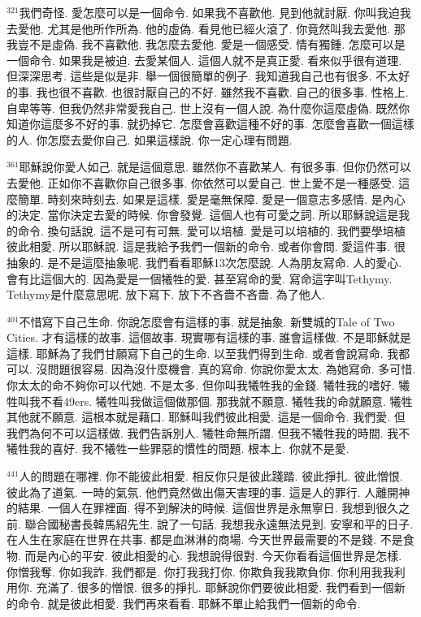 \documentclass{book}
\begin{document}
$^{321}$我們奇怪.
愛怎麼可以是一個命令.
如果我不喜歡他.
見到他就討厭.
你叫我迫我去愛他.
尤其是他所作所為.
他的虛偽.
看見他已經火滾了.
你竟然叫我去愛他.
那我豈不是虛偽.
我不喜歡他.
我怎麼去愛他.
愛是一個感受.
情有獨鍾.
怎麼可以是一個命令.
如果我是被迫.
去愛某個人.
這個人就不是真正愛.
看來似乎很有道理.
但深深思考.
這些是似是非.
舉一個很簡單的例子.
我知道我自己也有很多.
不太好的事.
我也很不喜歡.
也很討厭自己的不好.
雖然我不喜歡.
自己的很多事.
性格上.
自卑等等.
但我仍然非常愛我自己.
世上沒有一個人說.
為什麼你這麼虛偽.
既然你知道你這麼多不好的事.
就扔掉它.
怎麼會喜歡這種不好的事.
怎麼會喜歡一個這樣的人.
你怎麼去愛你自己.
如果這樣說.
你一定心理有問題.

$^{361}$耶穌說你愛人如己.
就是這個意思.
雖然你不喜歡某人.
有很多事.
但你仍然可以去愛他.
正如你不喜歡你自己很多事.
你依然可以愛自己.
世上愛不是一種感受.
這麼簡單.
時刻來時刻去.
如果是這樣.
愛是毫無保障.
愛是一個意志多感情.
是內心的決定.
當你決定去愛的時候.
你會發覺.
這個人也有可愛之詞.
所以耶穌說這是我的命令.
換句話說.
這不是可有可無.
愛可以培植.
愛是可以培植的.
我們要學培植彼此相愛.
所以耶穌說.
這是我給予我們一個新的命令.
或者你會問.
愛這件事.
很抽象的.
是不是這麼抽象呢.
我們看看耶穌13次怎麼說.
人為朋友寫命.
人的愛心.
會有比這個大的.
因為愛是一個犧牲的愛.
甚至寫命的愛.
寫命這字叫Tethymy.
Tethymy是什麼意思呢.
放下寫下.
放下不吝嗇不吝嗇.
為了他人.

$^{401}$不惜寫下自己生命.
你說怎麼會有這樣的事.
就是抽象.
新雙城的Tale of Two Cities.
才有這樣的故事.
這個故事.
現實哪有這樣的事.
誰會這樣做.
不是耶穌就是這樣.
耶穌為了我們甘願寫下自己的生命.
以至我們得到生命.
或者會說寫命.
我都可以.
沒問題很容易.
因為沒什麼機會.
真的寫命.
你說你愛太太.
為她寫命.
多可惜.
你太太的命不夠你可以代她.
不是太多.
但你叫我犧牲我的金錢.
犧牲我的嗜好.
犧牲叫我不看49ers.
犧牲叫我做這個做那個.
那我就不願意.
犧牲我的命就願意.
犧牲其他就不願意.
這根本就是藉口.
耶穌叫我們彼此相愛.
這是一個命令.
我們愛.
但我們為何不可以這樣做.
我們告訴別人.
犧牲命無所謂.
但我不犧牲我的時間.
我不犧牲我的喜好.
我不犧牲一些罪惡的慣性的問題.
根本上.
你就不是愛.

$^{441}$人的問題在哪裡.
你不能彼此相愛.
相反你只是彼此踐踏.
彼此掙扎.
彼此憎恨.
彼此為了道氣.
一時的氣氛.
他們竟然做出傷天害理的事.
這是人的罪行.
人離開神的結果.
一個人在罪裡面.
得不到解決的時候.
這個世界是永無寧日.
我想到很久之前.
聯合國秘書長韓馬紹先生.
說了一句話.
我想我永遠無法見到.
安寧和平的日子.
在人生在家庭在世界在共事.
都是血淋淋的商場.
今天世界最需要的不是錢.
不是食物.
而是內心的平安.
彼此相愛的心.
我想說得很對.
今天你看看這個世界是怎樣.
你憎我奪.
你如我詐.
我們都是.
你打我我打你.
你欺負我我欺負你.
你利用我我利用你.
充滿了.
很多的憎恨.
很多的掙扎.
耶穌說你們要彼此相愛.
我們看到一個新的命令.
就是彼此相愛.
我們再來看看.
耶穌不單止給我們一個新的命令.
\end{document}
